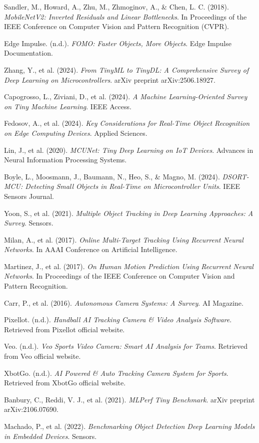 \documentclass{article}
\begin{document}
\begin{thebibliography}{99}

Sandler, M., Howard, A., Zhu, M., Zhmoginov, A., \& Chen, L. C. (2018).
\textit{MobileNetV2: Inverted Residuals and Linear Bottlenecks}.
In Proceedings of the IEEE Conference on Computer Vision and Pattern Recognition (CVPR).

Edge Impulse. (n.d.).
\textit{FOMO: Faster Objects, More Objects}.
Edge Impulse Documentation.

Zhang, Y., et al. (2024).
\textit{From TinyML to TinyDL: A Comprehensive Survey of Deep Learning on Microcontrollers}.
arXiv preprint arXiv:2506.18927.

Capogrosso, L., Ziviani, D., et al. (2024).
\textit{A Machine Learning-Oriented Survey on Tiny Machine Learning}.
IEEE Access.

Fedosov, A., et al. (2024).
\textit{Key Considerations for Real-Time Object Recognition on Edge Computing Devices}.
Applied Sciences.

Lin, J., et al. (2020).
\textit{MCUNet: Tiny Deep Learning on IoT Devices}.
Advances in Neural Information Processing Systems.

Boyle, L., Moosmann, J., Baumann, N., Heo, S., \& Magno, M. (2024).
\textit{DSORT-MCU: Detecting Small Objects in Real-Time on Microcontroller Units}.
IEEE Sensors Journal.

Yoon, S., et al. (2021).
\textit{Multiple Object Tracking in Deep Learning Approaches: A Survey}.
Sensors.

Milan, A., et al. (2017).
\textit{Online Multi-Target Tracking Using Recurrent Neural Networks}.
In AAAI Conference on Artificial Intelligence.

Martinez, J., et al. (2017).
\textit{On Human Motion Prediction Using Recurrent Neural Networks}.
In Proceedings of the IEEE Conference on Computer Vision and Pattern Recognition.

Carr, P., et al. (2016).
\textit{Autonomous Camera Systems: A Survey}.
AI Magazine.

Pixellot. (n.d.).
\textit{Handball AI Tracking Camera \& Video Analysis Software}.
Retrieved from Pixellot official website.

Veo. (n.d.).
\textit{Veo Sports Video Camera: Smart AI Analysis for Teams}.
Retrieved from Veo official website.

XbotGo. (n.d.).
\textit{AI Powered \& Auto Tracking Camera System for Sports}.
Retrieved from XbotGo official website.

Banbury, C., Reddi, V. J., et al. (2021).
\textit{MLPerf Tiny Benchmark}.
arXiv preprint arXiv:2106.07690.

Machado, P., et al. (2022).
\textit{Benchmarking Object Detection Deep Learning Models in Embedded Devices}.
Sensors.

\end{thebibliography}
\end{document}

